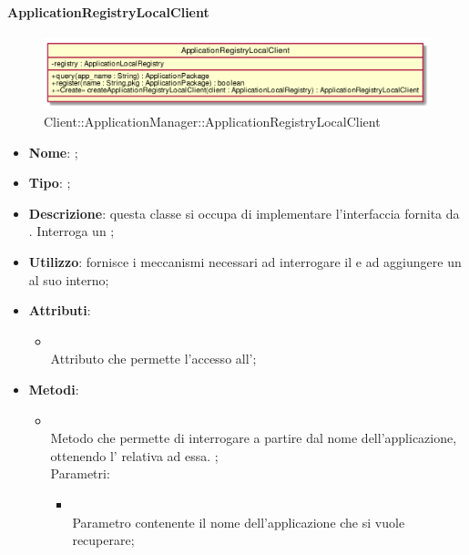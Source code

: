 \hypertarget{ApplicationRegistryLocalClient_label}{\paragraph{ApplicationRegistryLocalClient}}
\begin{figure}[h]
	\centering
	\includegraphics[width=\textwidth,height=\textheight,keepaspectratio]{images/ClassApplicationRegistryLocalClient.png}
	\caption{Client::ApplicationManager::ApplicationRegistryLocalClient}
\end{figure}
\begin{itemize}
	\item \textbf{Nome}: ;
	\item \textbf{Tipo}: ;
	\item \textbf{Descrizione}: questa classe si occupa di implementare l'interfaccia fornita da . Interroga un ;
	\item \textbf{Utilizzo}: fornisce i meccanismi necessari ad interrogare il  e ad aggiungere un  al suo interno;
	\item \textbf{Attributi}:
	\begin{itemize}
		\item[]  \\
		Attributo che permette l'accesso all';
	\end{itemize}
	\item \textbf{Metodi}:
	\begin{itemize}
		\item[]  \\
		Metodo che permette di interrogare  a partire dal nome dell'applicazione, ottenendo l' relativa ad essa. ;\\
		Parametri:
		\begin{itemize}
			\item {} \\
			Parametro contenente il nome dell'applicazione che si vuole recuperare;

\end{itemize}
\end{itemize}
\end{itemize}
